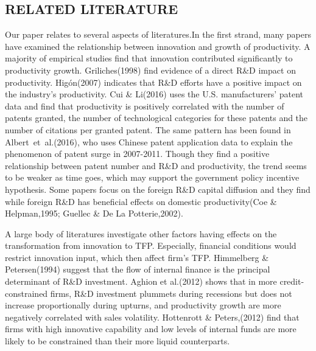 \documentclass[12pt]{article}%
\begin{document}
\begin{CJK*}{GBK}{fs}
\section{RELATED LITERATURE}
Our paper relates to several aspects of literatures.In the first strand, many papers have examined the relationship between innovation and growth of productivity. A majority of empirical studies find that innovation contributed significantly to productivity growth. \textcolor[rgb]{0.00,0.07,1.00}{Griliches(1998)} find evidence of a direct R\&D impact on productivity. \textcolor[rgb]{0.00,0.07,1.00}{Hig\'{o}n(2007)} indicates that R\&D efforts have a positive impact on the industry's productivity.   \textcolor[rgb]{0.00,0.07,1.00}{Cui \& Li(2016)} uses the U.S. manufacturers' patent data and find that productivity is positively correlated with the number of patents granted, the number of technological categories for these patents and the number of citations per granted patent. The same pattern has been found in \textcolor[rgb]{0.00,0.07,1.00}{Albert~et~al.(2016)}, who uses Chinese patent application data to explain the phenomenon of patent surge in 2007-2011. Though they find a positive relationship between patent number and R\&D and productivity, the trend seems to be weaker as time goes, which may support the government policy incentive hypothesis. Some papers focus on the foreign R\&D capital diffusion and they find while foreign R\&D has beneficial effects on domestic productivity(\textcolor[rgb]{0.00,0.07,1.00}{Coe \& Helpman,1995; Guellec \& De La Potterie,2002}).\par
A large body of literatures investigate other factors having effects on the transformation from innovation to TFP. Especially, financial conditions would restrict innovation input, which then affect firm's TFP. \textcolor[rgb]{0.00,0.07,1.00}{Himmelberg \& Petersen(1994)} suggest that the flow of internal finance is the principal determinant of R\&D investment. \textcolor[rgb]{0.00,0.07,1.00}{Aghion et al.(2012)} shows that in more credit-constrained firms, R\&D investment plummets during recessions but does not increase proportionally during upturns, and productivity growth are more negatively correlated with sales volatility. \textcolor[rgb]{0.00,0.07,1.00}{Hottenrott \& Peters,(2012)} find that firms with high innovative capability and low levels of internal funds are more likely to be constrained than their more liquid counterparts.  \par

\end{CJK*}
\end{document}
